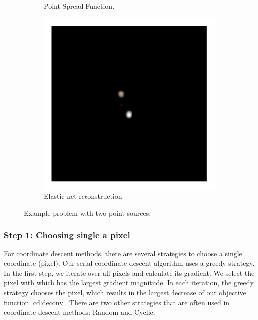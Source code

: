 \begin{figure}[h]
\begin{subfigure}[b]{0.3\linewidth}
		\caption{Point Spread Function.}
		\label{cd:serial:aid:psf}
	\end{subfigure}
	\begin{subfigure}[b]{0.3\linewidth}
		\includegraphics[width=\linewidth, clip, trim= 0.25in 0.25in 0.25in 0.25in]{./chapters/03.cd/simulated/elasticNet.png}
		\caption{Elastic net reconstruction}
		\label{cd:serial:aid:elastic}
	\end{subfigure}

	\caption{Example problem with two point sources.}
	\label{cd:serial:aid:figure}
\end{figure}

\subsubsection{Step 1: Choosing single a pixel}
For coordinate descent methods, there are several strategies to choose a single coordinate (pixel). Our serial coordinate descent algorithm uses a greedy strategy. In the first step, we iterate over all pixels and calculate its gradient. We select the pixel with which has the largest gradient magnitude. In each iteration, the greedy strategy chooses the pixel, which results in the largest decrease of our objective function \eqref{cd:deconv}. There are two other strategies that are often used in coordinate descent methods: Random and Cyclic.


